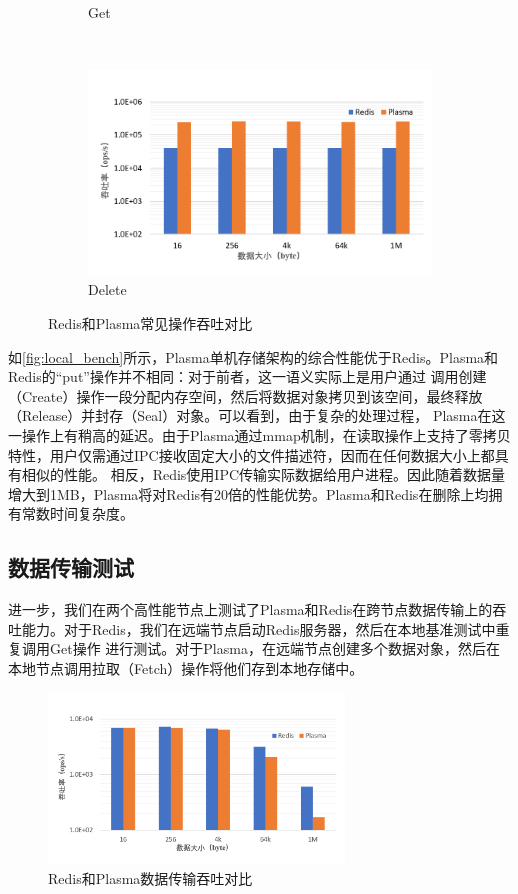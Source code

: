 \begin{figure}[h]
\begin{subfigure}{0.49\textwidth}
        \caption{Get}
    \end{subfigure}
    \\
    \centering
    \begin{subfigure}{0.49\textwidth}
        \includegraphics[width=\textwidth]{image/chap02/del.png}
        \caption{Delete}
    \end{subfigure}
    \caption{Redis和Plasma常见操作吞吐对比}
    \label{fig:local_bench}
\end{figure}

如\autoref{fig:local_bench}所示，Plasma单机存储架构的综合性能优于Redis。Plasma和Redis的“put”操作并不相同：对于前者，这一语义实际上是用户通过
调用创建（Create）操作一段分配内存空间，然后将数据对象拷贝到该空间，最终释放（Release）并封存（Seal）对象。可以看到，由于复杂的处理过程，
Plasma在这一操作上有稍高的延迟。由于Plasma通过mmap机制，在读取操作上支持了零拷贝特性，用户仅需通过IPC接收固定大小的文件描述符，因而在任何数据大小上都具有相似的性能。
相反，Redis使用IPC传输实际数据给用户进程。因此随着数据量增大到1MB，Plasma将对Redis有20倍的性能优势。Plasma和Redis在删除上均拥有常数时间复杂度。

\subsection{数据传输测试}

进一步，我们在两个高性能节点上测试了Plasma和Redis在跨节点数据传输上的吞吐能力。对于Redis，我们在远端节点启动Redis服务器，然后在本地基准测试中重复调用Get操作
进行测试。对于Plasma，在远端节点创建多个数据对象，然后在本地节点调用拉取（Fetch）操作将他们存到本地存储中。

\begin{figure}[h]
    \centering
    \includegraphics[width=0.7\textwidth]{image/chap02/fetch.png}
    \caption{Redis和Plasma数据传输吞吐对比}
    \label{fig:remote_bench}
\end{figure}

